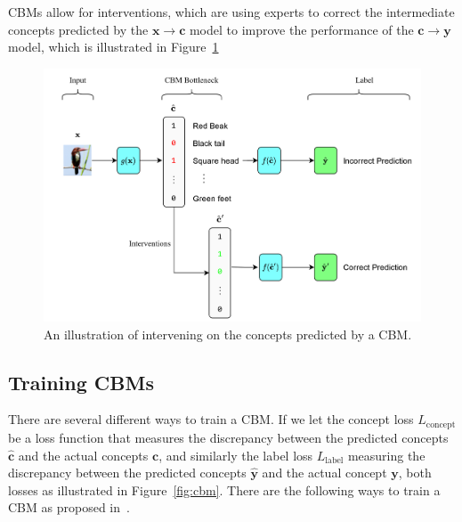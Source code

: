 CBMs allow for interventions, which are using experts to correct the intermediate concepts
predicted by the $\mathbf{x} \to \mathbf{c}$ model to improve the performance of the $\mathbf{c} \to \mathbf{y}$ model,
which is illustrated in Figure~\ref{fig:cbm-interventions}

\begin{figure}[!h]
    \centering
    \includegraphics[width=\textwidth]{figs/background/cbm_interventions.png}
    \caption{An illustration of intervening on the concepts predicted by a CBM.}
    \label{fig:cbm-interventions}
\end{figure}

\subsection{Training CBMs}

There are several different ways to train a CBM. 
If we let the concept loss $L_{\text{concept}}$ be a loss
 function that measures
the discrepancy between the predicted concepts $\hat{\mathbf{c}}$
and the actual concepts $\mathbf{c}$, and similarly the 
label loss $L_{\text{label}}$ measuring the discrepancy
between the predicted concepts $\hat{\mathbf{y}}$
and the actual concept $\mathbf{y}$,
both losses as illustrated in Figure~\ref{fig:cbm}.
There are the following ways
to train a CBM as proposed in~\cite{cbm}.

